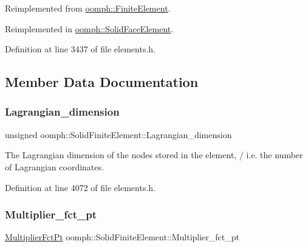 Reimplemented from \hyperlink{classoomph_1_1FiniteElement_a849561c5fbcbc07dc49d2dc6cca68559}{oomph\+::\+Finite\+Element}.



Reimplemented in \hyperlink{classoomph_1_1SolidFaceElement_a28526b0f7a7daa2ab90348e16cf6a529}{oomph\+::\+Solid\+Face\+Element}.



Definition at line 3437 of file elements.\+h.



\subsection{Member Data Documentation}
\mbox{\label{classoomph_1_1SolidFiniteElement_a4c2267355f097b864f9994f965ad8305}} 
\subsubsection{\texorpdfstring{Lagrangian\+\_\+dimension}{Lagrangian\_dimension}}
{\footnotesize\ttfamily unsigned oomph\+::\+Solid\+Finite\+Element\+::\+Lagrangian\+\_\+dimension\hspace{0.3cm}{\ttfamily [private]}}



The Lagrangian dimension of the nodes stored in the element, / i.\+e. the number of Lagrangian coordinates. 



Definition at line 4072 of file elements.\+h.

\mbox{\label{classoomph_1_1SolidFiniteElement_ad93b1496c6d963fd7f7b28d0e78bcbff}} 
\subsubsection{\texorpdfstring{Multiplier\+\_\+fct\+\_\+pt}{Multiplier\_fct\_pt}}
{\footnotesize\ttfamily \hyperlink{classoomph_1_1SolidFiniteElement_a1ec1cdf98041a51f77aab2b892856fc4}{Multiplier\+Fct\+Pt} oomph\+::\+Solid\+Finite\+Element\+::\+Multiplier\+\_\+fct\+\_\+pt\hspace{0.3cm}{\ttfamily [private]}}



